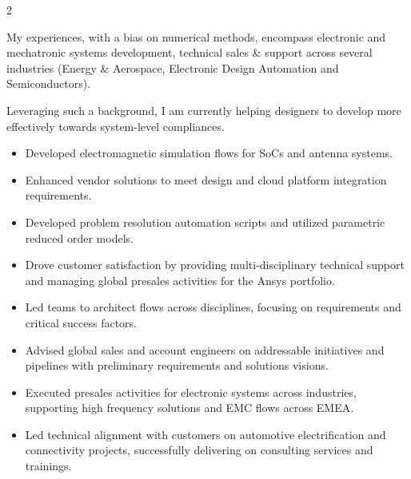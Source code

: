 \documentclass[9pt,a4paper,ragged2e,withhyper]{altacv} %
\begin{document}
\makecvheader


\begin{paracol}{2}


My experiences, with a bias on numerical methods, encompass electronic and mechatronic systems development, technical sales \& support across several industries (Energy \& Aerospace, Electronic Design Automation and Semiconductors).

\medskip

Leveraging such a background, I am currently helping designers to develop more effectively towards system-level compliances.


\begin{itemize}
\item Developed electromagnetic simulation flows for SoCs and antenna systems.
\item Enhanced vendor solutions to meet design and cloud platform integration requirements.
\item Developed problem resolution automation scripts and utilized parametric reduced order models.
\end{itemize}
\divider

\begin{itemize}
\item Drove customer satisfaction by providing multi-disciplinary technical support and managing global presales activities for the Ansys portfolio.
\item Led teams to architect flows across disciplines, focusing on requirements and critical success factors.
\item Advised global sales and account engineers on addressable initiatives and pipelines with preliminary requirements and solutions visions.
\end{itemize}
\divider

\begin{itemize}
\item Executed presales activities for electronic systems across industries, supporting high frequency solutions and EMC flows across EMEA.
\item Led technical alignment with customers on automotive electrification and connectivity projects, successfully delivering on consulting services and trainings.
\end{itemize}
\divider


\end{paracol}
\end{document}
